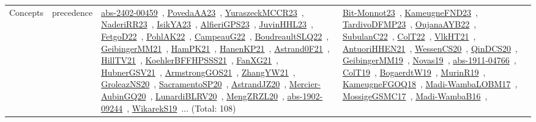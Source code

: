 {\begin{longtable}{lp{3cm}>{\raggedright\arraybackslash}p{6cm}>{\raggedright\arraybackslash}p{6cm}>{\raggedright\arraybackslash}p{8cm}}
Concepts & precedence & \href{articles/abs-2402-00459.pdf}{abs-2402-00459}~\cite{abs-2402-00459}, \href{papers/PovedaAA23.pdf}{PovedaAA23}~\cite{PovedaAA23}, \href{articles/YuraszeckMCCR23.pdf}{YuraszeckMCCR23}~\cite{YuraszeckMCCR23}, \href{articles/NaderiRR23.pdf}{NaderiRR23}~\cite{NaderiRR23}, \href{articles/IsikYA23.pdf}{IsikYA23}~\cite{IsikYA23}, \href{articles/AlfieriGPS23.pdf}{AlfieriGPS23}~\cite{AlfieriGPS23}, \href{papers/JuvinHHL23.pdf}{JuvinHHL23}~\cite{JuvinHHL23}, \href{articles/FetgoD22.pdf}{FetgoD22}~\cite{FetgoD22}, \href{articles/PohlAK22.pdf}{PohlAK22}~\cite{PohlAK22}, \href{articles/CampeauG22.pdf}{CampeauG22}~\cite{CampeauG22}, \href{papers/BoudreaultSLQ22.pdf}{BoudreaultSLQ22}~\cite{BoudreaultSLQ22}, \href{papers/GeibingerMM21.pdf}{GeibingerMM21}~\cite{GeibingerMM21}, \href{articles/HamPK21.pdf}{HamPK21}~\cite{HamPK21}, \href{papers/HanenKP21.pdf}{HanenKP21}~\cite{HanenKP21}, \href{papers/Astrand0F21.pdf}{Astrand0F21}~\cite{Astrand0F21}, \href{papers/HillTV21.pdf}{HillTV21}~\cite{HillTV21}, \href{articles/KoehlerBFFHPSSS21.pdf}{KoehlerBFFHPSSS21}~\cite{KoehlerBFFHPSSS21}, \href{articles/FanXG21.pdf}{FanXG21}~\cite{FanXG21}, \href{articles/HubnerGSV21.pdf}{HubnerGSV21}~\cite{HubnerGSV21}, \href{papers/ArmstrongGOS21.pdf}{ArmstrongGOS21}~\cite{ArmstrongGOS21}, \href{articles/ZhangYW21.pdf}{ZhangYW21}~\cite{ZhangYW21}, \href{papers/GroleazNS20.pdf}{GroleazNS20}~\cite{GroleazNS20}, \href{articles/SacramentoSP20.pdf}{SacramentoSP20}~\cite{SacramentoSP20}, \href{articles/AstrandJZ20.pdf}{AstrandJZ20}~\cite{AstrandJZ20}, \href{papers/Mercier-AubinGQ20.pdf}{Mercier-AubinGQ20}~\cite{Mercier-AubinGQ20}, \href{articles/LunardiBLRV20.pdf}{LunardiBLRV20}~\cite{LunardiBLRV20}, \href{articles/MengZRZL20.pdf}{MengZRZL20}~\cite{MengZRZL20}, \href{articles/abs-1902-09244.pdf}{abs-1902-09244}~\cite{abs-1902-09244}, \href{articles/WikarekS19.pdf}{WikarekS19}~\cite{WikarekS19}... (Total: 108) & \href{papers/Bit-Monnot23.pdf}{Bit-Monnot23}~\cite{Bit-Monnot23}, \href{papers/KameugneFND23.pdf}{KameugneFND23}~\cite{KameugneFND23}, \href{papers/TardivoDFMP23.pdf}{TardivoDFMP23}~\cite{TardivoDFMP23}, \href{papers/OujanaAYB22.pdf}{OujanaAYB22}~\cite{OujanaAYB22}, \href{articles/SubulanC22.pdf}{SubulanC22}~\cite{SubulanC22}, \href{articles/ColT22.pdf}{ColT22}~\cite{ColT22}, \href{articles/VlkHT21.pdf}{VlkHT21}~\cite{VlkHT21}, \href{papers/AntuoriHHEN21.pdf}{AntuoriHHEN21}~\cite{AntuoriHHEN21}, \href{papers/WessenCS20.pdf}{WessenCS20}~\cite{WessenCS20}, \href{articles/QinDCS20.pdf}{QinDCS20}~\cite{QinDCS20}, \href{papers/GeibingerMM19.pdf}{GeibingerMM19}~\cite{GeibingerMM19}, \href{articles/Novas19.pdf}{Novas19}~\cite{Novas19}, \href{articles/abs-1911-04766.pdf}{abs-1911-04766}~\cite{abs-1911-04766}, \href{papers/ColT19.pdf}{ColT19}~\cite{ColT19}, \href{papers/BogaerdtW19.pdf}{BogaerdtW19}~\cite{BogaerdtW19}, \href{papers/MurinR19.pdf}{MurinR19}~\cite{MurinR19}, \href{papers/KameugneFGOQ18.pdf}{KameugneFGOQ18}~\cite{KameugneFGOQ18}, \href{papers/Madi-WambaLOBM17.pdf}{Madi-WambaLOBM17}~\cite{Madi-WambaLOBM17}, \href{papers/MossigeGSMC17.pdf}{MossigeGSMC17}~\cite{MossigeGSMC17}, \href{papers/Madi-WambaB16.pdf}{Madi-WambaB16}~\cite{Madi-WambaB16}, 
\end{longtable}}
